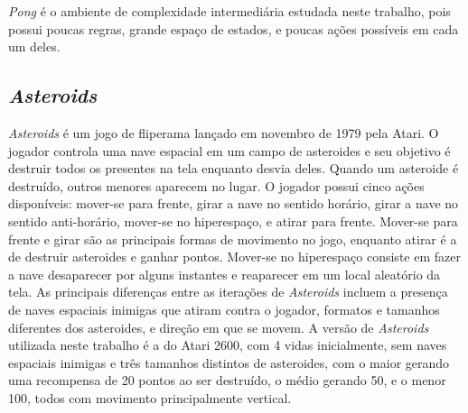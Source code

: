 \textit{Pong} é o ambiente de complexidade intermediária estudada neste trabalho, pois possui poucas regras, grande espaço de estados, e poucas ações possíveis em cada um deles.

\subsection{\textit{Asteroids}}
\label{sec:asteroids}

\textit{Asteroids} é um jogo de fliperama
lançado em novembro de 1979 pela
Atari.
O jogador controla uma nave espacial em um campo de asteroides e seu objetivo é destruir todos os presentes na tela enquanto desvia deles.
Quando um asteroide é destruído, outros menores aparecem no lugar.
O jogador possui cinco ações disponíveis: mover-se para frente, girar a nave no sentido horário, girar a nave no sentido anti-horário, mover-se no hiperespaço, e atirar para frente.
Mover-se para frente e girar são as principais formas de movimento no jogo, enquanto atirar é a de destruir asteroides e ganhar pontos.
Mover-se no hiperespaço consiste em fazer a nave desaparecer por alguns instantes e reaparecer em um local aleatório da tela.
As principais diferenças entre as iterações de \textit{Asteroids} incluem a presença de naves espaciais inimigas que atiram contra o jogador, formatos e tamanhos diferentes dos asteroides, e direção em que se movem.
A versão de \textit{Asteroids} utilizada neste trabalho é a do Atari 2600, com 4 vidas inicialmente, sem naves espaciais inimigas e três tamanhos distintos de asteroides, com o maior gerando uma recompensa de 20 pontos ao ser destruído, o médio gerando 50, e o menor 100, todos com movimento principalmente vertical.


